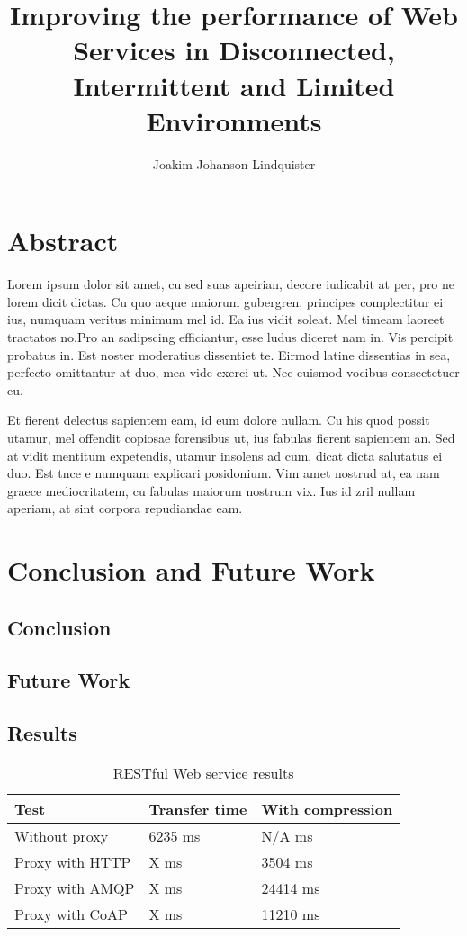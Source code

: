 \documentclass[USenglish]{ifimaster}
\title{Improving the performance of Web Services in Disconnected, Intermittent
and Limited Environments}
\author{Joakim Johanson Lindquister}
\begin{document}
\ififorside{}

\chapter*{Abstract}

Lorem ipsum dolor sit amet, cu sed suas apeirian, decore iudicabit at per, pro
ne lorem dicit dictas. Cu quo aeque maiorum gubergren, principes complectitur ei
ius, numquam veritus minimum mel id. Ea ius vidit soleat. Mel timeam laoreet
tractatos no.Pro an sadipscing efficiantur, esse ludus diceret nam in. Vis
percipit probatus in. Est noster moderatius dissentiet te. Eirmod latine
dissentias in sea, perfecto omittantur at duo, mea vide exerci ut. Nec euismod
vocibus consectetuer eu.

Et fierent delectus sapientem eam, id eum dolore nullam. Cu his quod possit
utamur, mel offendit copiosae forensibus ut, ius fabulas fierent sapientem an.
Sed at vidit mentitum expetendis, utamur insolens ad cum, dicat dicta salutatus
ei duo. Est tnce e numquam explicari posidonium. Vim amet nostrud at, ea nam graece
mediocritatem, cu fabulas maiorum nostrum vix. Ius id zril nullam aperiam, at
sint corpora repudiandae eam.

\tableofcontents
\listoftables
\listoffigures

\pagebreak








\chapter{Conclusion and Future Work}
\section{Conclusion}

\section{Future Work}

\pagebreak
\printbibliography{}
\printglossaries{}

\begin{appendices}
\chapter{Results}
\begin{table}[h!]
\begin{tabular}{| l | l | l |}
\hline
  \textbf{Test} & \textbf{Transfer time} & \textbf{With compression}\\ \hline
  Without proxy & 6235 ms & N/A ms \\ \hline
  Proxy with HTTP & X ms & 3504 ms \\ \hline
  Proxy with AMQP & X ms & 24414 ms \\ \hline
  Proxy with CoAP & X ms & 11210 ms \\ \hline
\end{tabular}
\caption{RESTful Web service results}
\end{table}
\end{appendices}
\end{document}
